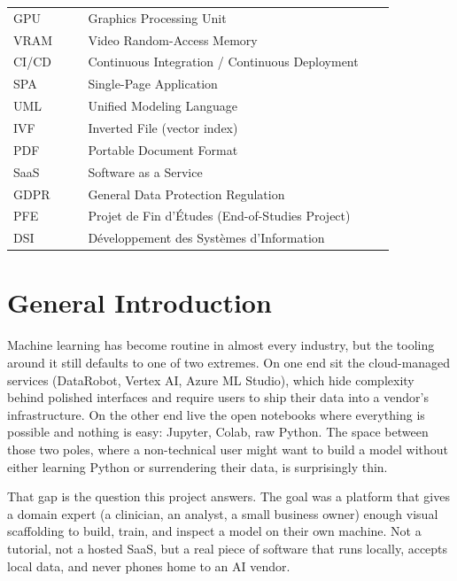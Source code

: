 \documentclass[12pt, a4paper, oneside]{report}
\begin{document}
\begin{longtable}{p{0.18\linewidth} L{0.74\linewidth}}
GPU       & Graphics Processing Unit \\
VRAM      & Video Random-Access Memory \\
CI/CD     & Continuous Integration / Continuous Deployment \\
SPA       & Single-Page Application \\
UML       & Unified Modeling Language \\
IVF       & Inverted File (vector index) \\
PDF       & Portable Document Format \\
SaaS      & Software as a Service \\
GDPR      & General Data Protection Regulation \\
PFE       & Projet de Fin d'\'Etudes (End-of-Studies Project) \\
DSI       & D\'eveloppement des Syst\`emes d'Information \\
\hline
\end{longtable}
\newpage

\chapter*{General Introduction}

Machine learning has become routine in almost every industry, but the
tooling around it still defaults to one of two extremes. On one end sit
the cloud-managed services (DataRobot, Vertex AI, Azure ML Studio), which hide complexity behind polished interfaces and require users
to ship their data into a vendor's infrastructure. On the other end
live the open notebooks where everything is possible and nothing is
easy: Jupyter, Colab, raw Python. The space between those two poles,
where a non-technical user might want to build a model without either
learning Python or surrendering their data, is surprisingly thin.

That gap is the question this project answers. The goal was a platform
that gives a domain expert (a clinician, an analyst, a small
business owner) enough visual scaffolding to build, train, and
inspect a model on their own machine. Not a tutorial, not a hosted
SaaS, but a real piece of software that runs locally, accepts local
data, and never phones home to an AI vendor.
\end{document}
